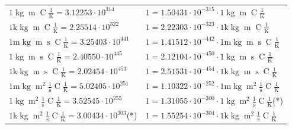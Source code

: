 \begin{center}
\begin{longtable}{l l}
{\color{black}$1 \bm{\mathrm{ }}\operatorname{kg}{\operatorname{m}}{}{\operatorname{C}}\frac1{\operatorname{K}} = 3.12253\cdot10^{314} $}   & {\color{black}$ 1 = 1.50431\cdot10^{-315} \cdot 1 \bm{\mathrm{ }}\operatorname{kg}{\operatorname{m}}{}{\operatorname{C}}\frac1{\operatorname{K}}$}  \\
{\color{gray}$1 \bm{\mathrm{ k}}\operatorname{kg}{\operatorname{m}}{}{\operatorname{C}}\frac1{\operatorname{K}} = 2.25514\cdot10^{322} $}   & {\color{gray}$ 1 = 2.22303\cdot10^{-323} \cdot 1 \bm{\mathrm{ k}}\operatorname{kg}{\operatorname{m}}{}{\operatorname{C}}\frac1{\operatorname{K}}$}  \\
{\color{gray}$1 \bm{\mathrm{ m}}\operatorname{kg}{\operatorname{m}}{\operatorname{s}}{\operatorname{C}}\frac1{\operatorname{K}} = 3.25403\cdot10^{441} $}   & {\color{gray}$ 1 = 1.41512\cdot10^{-442} \cdot 1 \bm{\mathrm{ m}}\operatorname{kg}{\operatorname{m}}{\operatorname{s}}{\operatorname{C}}\frac1{\operatorname{K}}$}  \\
{\color{black}$1 \bm{\mathrm{ }}\operatorname{kg}{\operatorname{m}}{\operatorname{s}}{\operatorname{C}}\frac1{\operatorname{K}} = 2.40550\cdot10^{445} $}   & {\color{black}$ 1 = 2.12104\cdot10^{-450} \cdot 1 \bm{\mathrm{ }}\operatorname{kg}{\operatorname{m}}{\operatorname{s}}{\operatorname{C}}\frac1{\operatorname{K}}$}  \\
{\color{gray}$1 \bm{\mathrm{ k}}\operatorname{kg}{\operatorname{m}}{\operatorname{s}}{\operatorname{C}}\frac1{\operatorname{K}} = 2.02454\cdot10^{453} $}   & {\color{gray}$ 1 = 2.51531\cdot10^{-454} \cdot 1 \bm{\mathrm{ k}}\operatorname{kg}{\operatorname{m}}{\operatorname{s}}{\operatorname{C}}\frac1{\operatorname{K}}$}  \\
{\color{gray}$1 \bm{\mathrm{ m}}\operatorname{kg}{\operatorname{m}^2}\frac1{\operatorname{s}}{\operatorname{C}}\frac1{\operatorname{K}} = 5.02405\cdot10^{251} $}   & {\color{gray}$ 1 = 1.10322\cdot10^{-252} \cdot 1 \bm{\mathrm{ m}}\operatorname{kg}{\operatorname{m}^2}\frac1{\operatorname{s}}{\operatorname{C}}\frac1{\operatorname{K}}$}  \\
{\color{black}$1 \bm{\mathrm{ }}\operatorname{kg}{\operatorname{m}^2}\frac1{\operatorname{s}}{\operatorname{C}}\frac1{\operatorname{K}} = 3.52545\cdot10^{255} $}   & {\color{black}$ 1 = 1.31055\cdot10^{-300} \cdot 1 \bm{\mathrm{ }}\operatorname{kg}{\operatorname{m}^2}\frac1{\operatorname{s}}{\operatorname{C}}\frac1{\operatorname{K}}$}\quad(*)\\
{\color{gray}$1 \bm{\mathrm{ k}}\operatorname{kg}{\operatorname{m}^2}\frac1{\operatorname{s}}{\operatorname{C}}\frac1{\operatorname{K}} = 3.00434\cdot10^{303} $}\quad(*) & {\color{gray}$ 1 = 1.55254\cdot10^{-304} \cdot 1 \bm{\mathrm{ k}}\operatorname{kg}{\operatorname{m}^2}\frac1{\operatorname{s}}{\operatorname{C}}\frac1{\operatorname{K}}$}  \\

\end{longtable}
\end{center}
